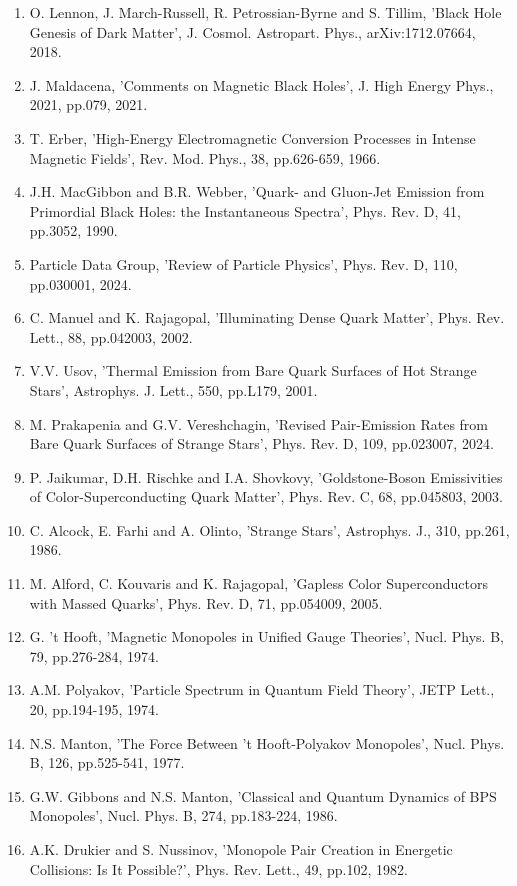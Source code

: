 \documentclass[12pt,a4paper]{article}
\begin{document}
\begin{enumerate}
\item O. Lennon, J. March-Russell, R. Petrossian-Byrne and S. Tillim, 'Black Hole Genesis of Dark Matter', J. Cosmol. Astropart. Phys., arXiv:1712.07664, 2018.
\item J. Maldacena, 'Comments on Magnetic Black Holes', J. High Energy Phys., 2021, pp.079, 2021.
\item T. Erber, 'High-Energy Electromagnetic Conversion Processes in Intense Magnetic Fields', Rev. Mod. Phys., 38, pp.626-659, 1966.
\item J.H. MacGibbon and B.R. Webber, 'Quark- and Gluon-Jet Emission from Primordial Black Holes: the Instantaneous Spectra', Phys. Rev. D, 41, pp.3052, 1990.
\item Particle Data Group, 'Review of Particle Physics', Phys. Rev. D, 110, pp.030001, 2024.
\item C. Manuel and K. Rajagopal, 'Illuminating Dense Quark Matter', Phys. Rev. Lett., 88, pp.042003, 2002.
\item V.V. Usov, 'Thermal Emission from Bare Quark Surfaces of Hot Strange Stars', Astrophys. J. Lett., 550, pp.L179, 2001.
\item M. Prakapenia and G.V. Vereshchagin, 'Revised Pair-Emission Rates from Bare Quark Surfaces of Strange Stars', Phys. Rev. D, 109, pp.023007, 2024.
\item P. Jaikumar, D.H. Rischke and I.A. Shovkovy, 'Goldstone-Boson Emissivities of Color-Superconducting Quark Matter', Phys. Rev. C, 68, pp.045803, 2003.
\item C. Alcock, E. Farhi and A. Olinto, 'Strange Stars', Astrophys. J., 310, pp.261, 1986.
\item M. Alford, C. Kouvaris and K. Rajagopal, 'Gapless Color Superconductors with Massed Quarks', Phys. Rev. D, 71, pp.054009, 2005.
\item G. 't Hooft, 'Magnetic Monopoles in Unified Gauge Theories', Nucl. Phys. B, 79, pp.276-284, 1974.
\item A.M. Polyakov, 'Particle Spectrum in Quantum Field Theory', JETP Lett., 20, pp.194-195, 1974.
\item N.S. Manton, 'The Force Between 't Hooft-Polyakov Monopoles', Nucl. Phys. B, 126, pp.525-541, 1977.
\item G.W. Gibbons and N.S. Manton, 'Classical and Quantum Dynamics of BPS Monopoles', Nucl. Phys. B, 274, pp.183-224, 1986.
\item A.K. Drukier and S. Nussinov, 'Monopole Pair Creation in Energetic Collisions: Is It Possible?', Phys. Rev. Lett., 49, pp.102, 1982.

\end{enumerate}
\end{document}
